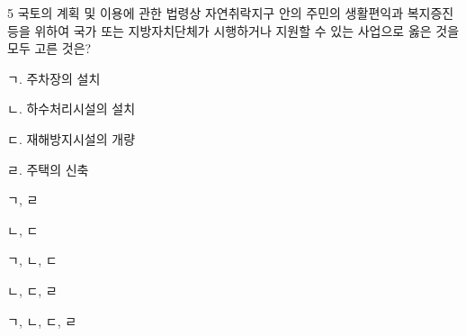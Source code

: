 \begin{question}{5}
국토의 계획 및 이용에 관한 법령상 자연취락지구 안의 주민의 생활편익과 복지증진 등을 위하여 국가 또는 지방자치단체가 시행하거나 지원할 수 있는 사업으로 옳은 것을 모두 고른 것은?
\begin{framedtext}
ㄱ. 주차장의 설치 \par
ㄴ. 하수처리시설의 설치 \par
ㄷ. 재해방지시설의 개량 \par
ㄹ. 주택의 신축 \par
\end{framedtext}
\begin{choices}
  \item ㄱ, ㄹ
  \item ㄴ, ㄷ
  \item ㄱ, ㄴ, ㄷ
  \item ㄴ, ㄷ, ㄹ
  \item ㄱ, ㄴ, ㄷ, ㄹ
\end{choices}
\end{question}
